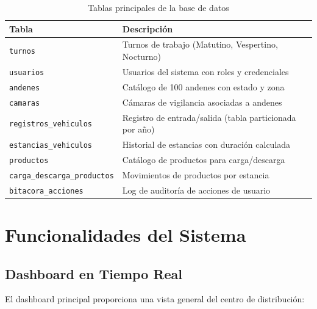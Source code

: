 \documentclass[12pt,a4paper]{article}
\begin{document}
\begin{table}[H]
    \centering
    \begin{tabularx}{\textwidth}{|l|X|}
        \hline
        \textbf{Tabla} & \textbf{Descripción} \\
        \hline
        \texttt{turnos} & Turnos de trabajo (Matutino, Vespertino, Nocturno) \\
        \hline
        \texttt{usuarios} & Usuarios del sistema con roles y credenciales \\
        \hline
        \texttt{andenes} & Catálogo de 100 andenes con estado y zona \\
        \hline
        \texttt{camaras} & Cámaras de vigilancia asociadas a andenes \\
        \hline
        \texttt{registros\_vehiculos} & Registro de entrada/salida (tabla particionada por año) \\
        \hline
        \texttt{estancias\_vehiculos} & Historial de estancias con duración calculada \\
        \hline
        \texttt{productos} & Catálogo de productos para carga/descarga \\
        \hline
        \texttt{carga\_descarga\_productos} & Movimientos de productos por estancia \\
        \hline
        \texttt{bitacora\_acciones} & Log de auditoría de acciones de usuario \\
        \hline
    \end{tabularx}
    \caption{Tablas principales de la base de datos}
\end{table}

\section{Funcionalidades del Sistema}

\subsection{Dashboard en Tiempo Real}

El dashboard principal proporciona una vista general del centro de distribución:
\end{document}

